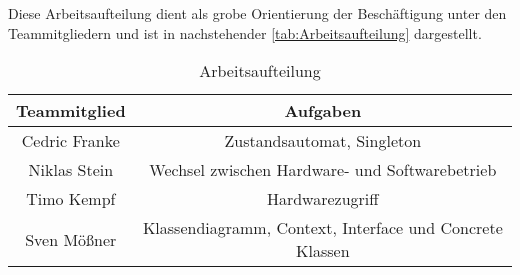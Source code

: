Diese Arbeitsaufteilung dient als grobe Orientierung der Beschäftigung unter den Teammitgliedern und ist in nachstehender \autoref{tab:Arbeitsaufteilung} dargestellt.\

\begin{table}[H] 
	\centering
	\begin{tabular}[H]{c|c} \label{tab2}
		Teammitglied & Aufgaben \\
		\hline
		Cedric Franke & Zustandsautomat, Singleton\\
		Niklas Stein &  Wechsel zwischen Hardware- und Softwarebetrieb \\
		Timo Kempf & Hardwarezugriff  \\
		Sven Mößner & Klassendiagramm, Context, Interface und Concrete Klassen \\
	\end{tabular}
	\caption{Arbeitsaufteilung}
	\label{tab:Arbeitsaufteilung}
\end{table}